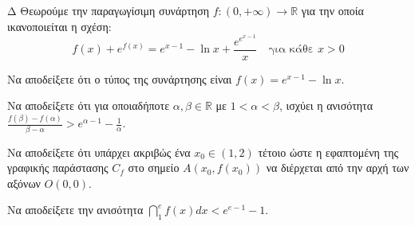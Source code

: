 \begin{thema}{Δ}
Θεωρούμε την παραγωγίσιμη συνάρτηση $f: (0, +\infty) \to \mathbb{R}$ για την οποία ικανοποιείται η σχέση:
\[ f(x) + e^{f(x)} = e^{x-1} - \ln x + \frac{e^{e^{x-1}}}{x} \quad \text{για κάθε } x > 0 \]
\begin{erwthma}
    \item Να αποδείξετε ότι ο τύπος της συνάρτησης είναι $f(x) = e^{x-1} - \ln x$. 
    \item Να αποδείξετε ότι για οποιαδήποτε $\alpha, \beta \in \mathbb{R}$ με $1 < \alpha < \beta$, ισχύει η ανισότητα $\frac{f(\beta) - f(\alpha)}{\beta - \alpha} > e^{\alpha-1} - \frac{1}{\alpha}$. 
    \item Να αποδείξετε ότι υπάρχει ακριβώς ένα $x_0 \in (1, 2)$ τέτοιο ώστε η εφαπτομένη της γραφικής παράστασης $C_f$ στο σημείο $A(x_0, f(x_0))$ να διέρχεται από την αρχή των αξόνων $O(0,0)$. 
    \item Να αποδείξετε την ανισότητα $\dint_1^e f(x) dx < e^{e-1} - 1$. 
\end{erwthma}
\end{thema}
